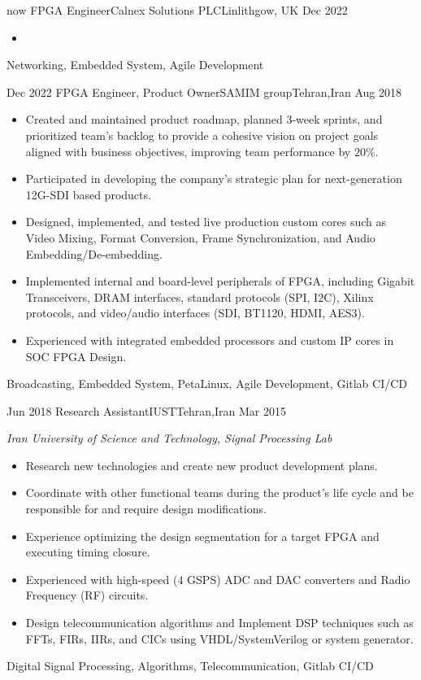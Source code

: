 
\begin{experiences}
	\experience
	{now} {FPGA Engineer}{Calnex Solutions PLC}{Linlithgow, UK}
	{Dec 2022} {
		\begin{itemize}
			\item 
		\end{itemize}
	}
	{Networking, Embedded System, Agile Development}
	
	\emptySeparator
	
	\experience
	{Dec 2022} {FPGA Engineer, Product Owner}{SAMIM group}{Tehran,Iran}
	{Aug 2018} {
		\begin{itemize}
			\item Created and maintained product roadmap, planned 3-week sprints,
			      and prioritized team's backlog to provide a cohesive vision on
			      project goals aligned with business objectives, improving team
			      performance by $20\%$.
			\item Participated in developing the company's strategic plan for
			      next-generation 12G-SDI based products.
			\item Designed, implemented, and tested live production custom cores
			      such as Video Mixing, Format Conversion, Frame Synchronization,
			      and Audio Embedding/De-embedding.
			\item Implemented internal and board-level peripherals of FPGA, including
			      Gigabit Transceivers, DRAM interfaces,
			      standard protocols (SPI, I2C), Xilinx protocols, and video/audio
			      interfaces (SDI, BT1120, HDMI, AES3).
			\item Experienced with integrated embedded processors and custom IP cores
			      in SOC FPGA Design.
		\end{itemize}
	}
	{Broadcasting, Embedded System, PetaLinux, Agile Development, Gitlab CI/CD}
	
	\emptySeparator
	
	\experience
	{Jun 2018} {Research Assistant}{IUST}{Tehran,Iran}
	{Mar 2015} {
		\emph{Iran University of Science and Technology, Signal Processing Lab}
		\begin{itemize}
			\item Research new technologies and create new product development plans.
			\item Coordinate with other functional teams during the product's life
			      cycle and be responsible for and require design modifications.
			\item Experience optimizing the design segmentation for a target FPGA
			      and executing timing closure.
			\item Experienced with high-speed ($4$ GSPS) ADC and DAC converters
			      and Radio Frequency (RF) circuits.
			\item Design telecommunication algorithms and Implement DSP techniques
			      such as FFTs, FIRs, IIRs, and CICs using VHDL/SystemVerilog
			      or system generator.
		\end{itemize}
	}
	{Digital Signal Processing, Algorithms, Telecommunication, Gitlab CI/CD}
	

\end{experiences}
